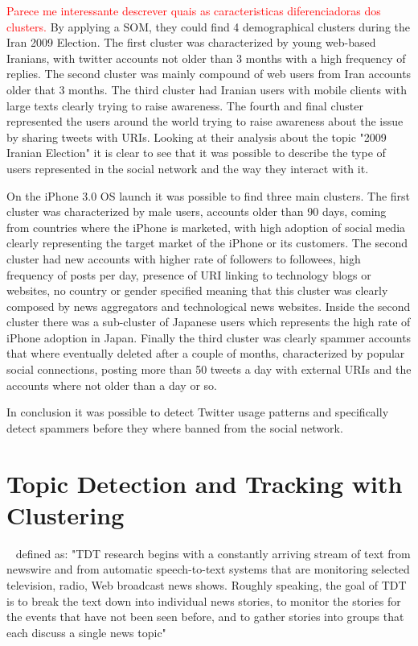                                                                                                           \textcolor{red}{Parece me interessante descrever quais as caracteristicas diferenciadoras dos clusters.}
By applying a \ac{SOM}, they could find 4 demographical clusters during the Iran 2009 Election. The first cluster was characterized by young web-based Iranians, with twitter accounts not older than 3 months with a high frequency of replies. The second cluster was mainly compound of web users from Iran accounts older that 3 months. The third cluster had Iranian users with mobile clients with large texts clearly trying to raise awareness. The fourth and final cluster represented the users around the world trying to raise awareness about the issue by sharing tweets with URIs.
Looking at their analysis about the topic "2009 Iranian Election" it is clear to see that it was possible to describe the type of users represented in the social network and the way they interact with it.

On the iPhone 3.0 OS launch it was possible to find three main clusters. The first cluster was characterized by male users, accounts older than 90 days, coming from countries where the iPhone is marketed, with high adoption of social media clearly representing the target market of the iPhone or its customers. The second cluster had new accounts with higher rate of followers to followees, high frequency of posts per day, presence of URI linking to technology blogs or websites, no country or gender specified meaning that this cluster was clearly composed by news aggregators and technological news websites. Inside the second cluster there was a sub-cluster of Japanese users which represents the high rate of iPhone adoption in Japan. Finally the third cluster was clearly spammer accounts that where eventually deleted after a couple of months, characterized by popular social connections, posting more than 50 tweets a day with external URIs and the accounts where not older than a day or so.

In conclusion it was possible to detect Twitter usage patterns and specifically detect spammers before they where banned from the social network. 

\section{Topic Detection and Tracking with Clustering} 
\label{sec:topic_detection_on_twitter}

~\citet{allan2002topic} defined as: "\ac{TDT} research begins with a constantly arriving stream of text from newswire and from automatic speech-to-text systems that are monitoring selected television, radio, Web broadcast news shows. Roughly speaking, the goal of \ac{TDT} is to break the text down into individual news stories, to monitor the stories for the events that have not been seen before, and to gather stories into groups that each discuss a single news topic"


